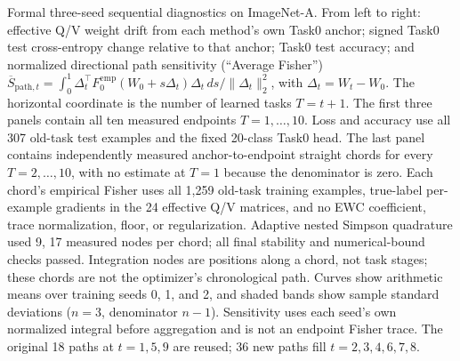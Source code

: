 \caption{Formal three-seed sequential diagnostics on ImageNet-A. From left to right: effective Q/V weight drift from each method's own Task0 anchor; signed Task0 test cross-entropy change relative to that anchor; Task0 test accuracy; and normalized directional path sensitivity (``Average Fisher'') $\overline S_{\mathrm{path},t}=\int_0^1\Delta_t^\top F_0^{\mathrm{emp}}(W_0+s\Delta_t)\Delta_t\,ds/\|\Delta_t\|_2^2$, with $\Delta_t=W_t-W_0$. The horizontal coordinate is the number of learned tasks $T=t+1$. The first three panels contain all ten measured endpoints $T=1,\ldots,10$. Loss and accuracy use all 307 old-task test examples and the fixed 20-class Task0 head. The last panel contains independently measured anchor-to-endpoint straight chords for every $T=2,\ldots,10$, with no estimate at $T=1$ because the denominator is zero. Each chord's empirical Fisher uses all 1,259 old-task training examples, true-label per-example gradients in the 24 effective Q/V matrices, and no EWC coefficient, trace normalization, floor, or regularization. Adaptive nested Simpson quadrature used 9, 17 measured nodes per chord; all final stability and numerical-bound checks passed. Integration nodes are positions along a chord, not task stages; these chords are not the optimizer's chronological path. Curves show arithmetic means over training seeds 0, 1, and 2, and shaded bands show sample standard deviations ($n=3$, denominator $n-1$). Sensitivity uses each seed's own normalized integral before aggregation and is not an endpoint Fisher trace. The original 18 paths at $t=1,5,9$ are reused; 36 new paths fill $t=2,3,4,6,7,8$.}

